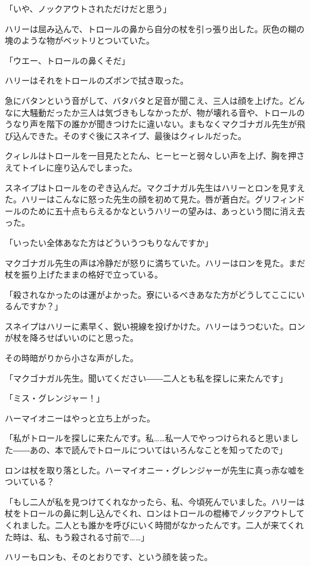 \documentclass[10pt,a4paper]{article}
\begin{document}
\begin{CJK}{UTF8}{min}
「いや、ノックアウトされただけだと思う」

ハリーは屈み込んで、トロールの鼻から自分の杖を引っ張り出した。灰色の糊の塊のような物がベットリとついていた。

「ウエー、トロールの鼻くそだ」

ハリーはそれをトロールのズボンで拭き取った。

急にバタンという音がして、バタバタと足音が聞こえ、三人は顔を上げた。どんなに大騒動だったか三人は気づきもしなかったが、物が壊れる音や、トロールのうなり声を階下の誰かが聞きつけたに違いない。まもなくマクゴナガル先生が飛び込んできた。そのすぐ後にスネイプ、最後はクィレルだった。

クィレルはトロールを一目見たとたん、ヒーヒーと弱々しい声を上げ、胸を押さえてトイレに座り込んでしまった。

スネイプはトロールをのぞき込んだ。マクゴナガル先生はハリーとロンを見すえた。ハリーはこんなに怒った先生の顔を初めて見た。唇が蒼白だ。グリフィンドールのために五十点もらえるかなというハリーの望みは、あっという間に消え去った。

「いったい全体あなた方はどういうつもりなんですか」

マクゴナガル先生の声は冷静だが怒りに満ちていた。ハリーはロンを見た。まだ杖を振り上げたままの格好で立っている。

「殺されなかったのは運がよかった。寮にいるべきあなた方がどうしてここにいるんですか？」

スネイプはハリーに素早く、鋭い視線を投げかけた。ハリーはうつむいた。ロンが杖を降ろせばいいのにと思った。

その時暗がりから小さな声がした。

「マクゴナガル先生。聞いてください――二人とも私を探しに来たんです」

「ミス・グレンジャー！」

ハーマイオニーはやっと立ち上がった。

「私がトロールを探しに来たんです。私……私一人でやっつけられると思いました――あの、本で読んでトロールについてはいろんなことを知ってたので」

ロンは杖を取り落とした。ハーマイオニー・グレンジャーが先生に真っ赤な嘘をついている？

「もし二人が私を見つけてくれなかったら、私、今頃死んでいました。ハリーは杖をトロールの鼻に刺し込んでくれ、ロンはトロールの棍棒でノックアウトしてくれました。二人とも誰かを呼びにいく時間がなかったんです。二人が来てくれた時は、私、もう殺される寸前で……」

ハリーもロンも、そのとおりです、という顔を装った。


\end{CJK}
\end{document}
